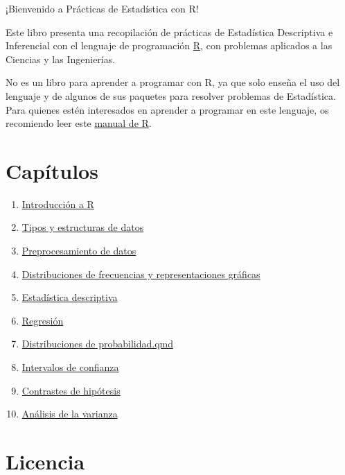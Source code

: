 \documentclass[
  a4paper,
]{scrreport}
\providecommand{\tightlist}{%
  \setlength{\itemsep}{0pt}\setlength{\parskip}{0pt}}\usepackage{longtable,booktabs,array}
\theoremstyle{definition}
\theoremstyle{remark}
\begin{document}

¡Bienvenido a Prácticas de Estadística con R!

Este libro presenta una recopilación de prácticas de Estadística
Descriptiva e Inferencial con el lenguaje de programación
\href{https://www.r-project.org/}{R}, con problemas aplicados a las
Ciencias y las Ingenierías.

No es un libro para aprender a programar con R, ya que solo enseña el
uso del lenguaje y de algunos de sus paquetes para resolver problemas de
Estadística. Para quienes estén interesados en aprender a programar en
este lenguaje, os recomiendo leer este
\href{https://aprendeconalf.es/manual-r/}{manual de R}.

\section*{Capítulos}\label{capuxedtulos}


\begin{enumerate}
\def\labelenumi{\arabic{enumi}.}
\tightlist
\item
  \href{./01-intro.qmd}{Introducción a R}
\item
  \href{02-tipos-datos.qmd}{Tipos y estructuras de datos}
\item
  \href{03-preprocesamiento-datos.qmd}{Preprocesamiento de datos}
\item
  \href{04-frecuencias-graficos.qmd}{Distribuciones de frecuencias y
  representaciones gráficas}
\item
  \href{05-descriptiva.qmd}{Estadística descriptiva}
\item
  \href{06-regresion.qmd}{Regresión}
\item
  \href{07-distribuciones-probabilidad.qmd}{Distribuciones de
  probabilidad.qmd}
\item
  \href{08-intervalos-confianza.qmd}{Intervalos de confianza}
\item
  \href{09-contrastes-hipotesis-parametricos.qmd}{Contrastes de
  hipótesis}
\item
  \href{10-anova.qmd}{Análisis de la varianza}
\end{enumerate}

\section*{Licencia}\label{licencia}
\end{document}
